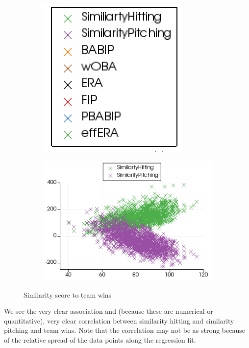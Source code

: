 \documentclass[12pt]{article}
\numberwithin{equation}{subsection}
\begin{document}
\begin{figure}[H] 
  \begin{subfigure}[b]{0.5\linewidth}
    \centering
    \includegraphics[width=0.6\linewidth]{winslegend} 
    \captionsetup{justification=centering}
    \label{fig2:a} 
    \vspace{4ex}
  \end{subfigure}%
  \begin{subfigure}[b]{0.5\linewidth}
    \centering
    \includegraphics[width=0.9\linewidth]{wins1} 
    \captionsetup{justification=centering}
    \label{fig2:b} 
    \vspace{4ex}
  \end{subfigure} 
  \caption{Similarity score to team wins}
\end{figure}

We see the very clear association and (because these are numerical or quantitative), very clear correlation between similarity hitting and similarity pitching and team wins. Note that the correlation may not be as strong because of the relative spread of the data points along the regression fit.
\end{document}
